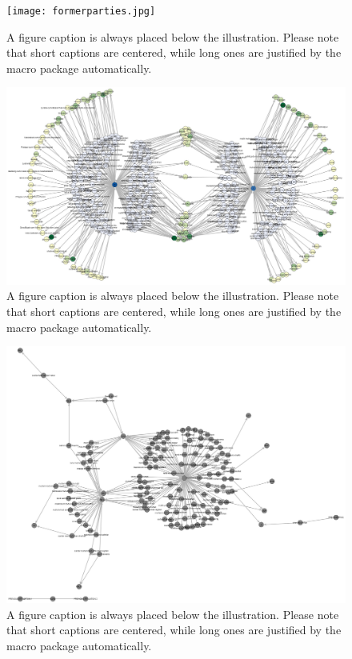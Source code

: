 \documentclass[runningheads]{llncs}
\begin{document}
\begin{figure}
\texttt{[image: formerparties.jpg]}
\caption{A figure caption is always placed below the illustration.
Please note that short captions are centered, while long ones are
justified by the macro package automatically.} \label{fig1}
\end{figure}

\begin{figure}
\includegraphics[width=\textwidth]{labelled_mna_sheet.jpg}
\caption{A figure caption is always placed below the illustration.
Please note that short captions are centered, while long ones are
justified by the macro package automatically.} \label{fig1}
\end{figure}

\begin{figure}
\includegraphics[width=\textwidth]{formerparties1.jpg}
\caption{A figure caption is always placed below the illustration.
Please note that short captions are centered, while long ones are
justified by the macro package automatically.} \label{fig1}
\end{figure}
\end{document}
